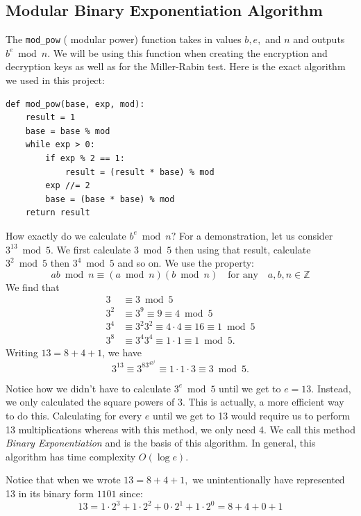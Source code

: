 \documentclass{article}
\begin{document}
	\subsection{Modular Binary Exponentiation Algorithm}
	The \texttt{mod\_pow} ( modular power) function  takes in values $b, e,$ and $n$ and outputs $b^e \bmod n.$ We will be using this function when creating the encryption and decryption keys as well as for the Miller-Rabin test.  Here is the exact algorithm we used in this project:
	
	\begin{lstlisting}[title=Modular Binary Exponentiation Algorithm]
def mod_pow(base, exp, mod):
	result = 1
	base = base % mod
	while exp > 0:
		if exp % 2 == 1:
			result = (result * base) % mod
		exp //= 2
		base = (base * base) % mod
	return result
	\end{lstlisting}
	
	How exactly do we calculate $b^e \bmod n?$ For a demonstration, let us consider $3^{13} \bmod 5.$ We first calculate $3 \bmod 5$ then using that result, calculate $3^2 \bmod 5$ then $3^4 \bmod 5$ and so on. We use the property:
	\begin{equation} \label{1}
		ab \bmod n \equiv (a \bmod n)(b \bmod n) \quad \text{for any} \quad  a,b,n \in \mathbb{Z}
	\end{equation}
	We find that
	\begin{align*}
		3 &\equiv 3 \bmod 5 \\
		3^2 &\equiv 3^9 \equiv 9 \equiv 4 \bmod 5 \\
		3^4 &\equiv 3^2 3^2 \equiv 4 \cdot 4 \equiv 16 \equiv 1 \bmod 5 \\
		3^8 &\equiv 3^4 3^4 \equiv 1 \cdot 1 \equiv 1 \bmod 5.
	\end{align*}
	Writing $13=8+4+1$, we have
	$$3^{13} \equiv 3^83^43^1 \equiv1 \cdot 1 \cdot 3 \equiv 3 \bmod 5.$$
	
	Notice how we didn't have to calculate $3^e \bmod 5$ until we get to $e=13.$ Instead, we only calculated the square powers of 3. This is actually, a more efficient way to do this. Calculating for every $e$ until we get to 13 would require us to perform 13 multiplications whereas with this method, we only need 4. We call this method \textit{Binary Exponentiation} and is the basis of this algorithm. In general, this algorithm has time complexity $O(\log e).$
	
	Notice that when we wrote $13=8+4+1,$ we unintentionally have represented 13 in its binary form $1101$ since:
	$$13= 1\cdot 2^3 + 1 \cdot 2^2 + 0 \cdot 2^1 + 1 \cdot 2^0= 8+4+0+1$$
	
\end{document}

